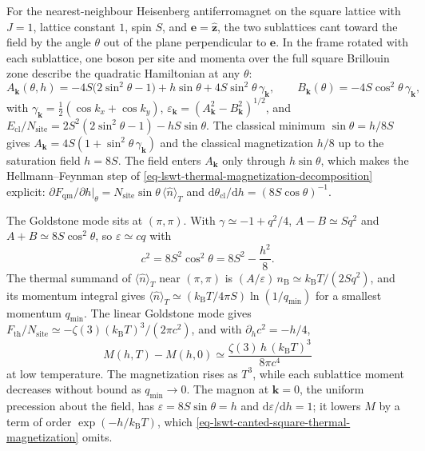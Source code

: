 For the nearest-neighbour Heisenberg antiferromagnet on the square lattice with \(J=1\), lattice constant \(1\), spin \(S\), and \(\mathbf e=\hat{\mathbf z}\), the two sublattices cant toward the field by the angle \(\theta\) out of the plane perpendicular to \(\mathbf e\). In the frame rotated with each sublattice, one boson per site and momenta over the full square Brillouin zone describe the quadratic Hamiltonian at any \(\theta\):
\[
A_{\mathbf k}(\theta,h)=-4S\big(2\sin^2\theta-1\big)+h\sin\theta+4S\sin^2\theta\,\gamma_{\mathbf k},
\qquad
B_{\mathbf k}(\theta)=-4S\cos^2\theta\,\gamma_{\mathbf k},
\]
with \(\gamma_{\mathbf k}=\tfrac12(\cos k_x+\cos k_y)\), \(\varepsilon_{\mathbf k}=(A_{\mathbf k}^2-B_{\mathbf k}^2)^{1/2}\), and \(E_{\mathrm{cl}}/N_{\mathrm{site}}=2S^2(2\sin^2\theta-1)-hS\sin\theta\). The classical minimum \(\sin\theta=h/8S\) gives \(A_{\mathbf k}=4S(1+\sin^2\theta\,\gamma_{\mathbf k})\) and the classical magnetization \(h/8\) up to the saturation field \(h=8S\). The field enters \(A_{\mathbf k}\) only through \(h\sin\theta\), which makes the Hellmann--Feynman step of \eqref{eq-lswt-thermal-magnetization-decomposition} explicit: \(\partial F_{\mathrm{qm}}/\partial h|_\theta=N_{\mathrm{site}}\sin\theta\,\langle\hat n\rangle_T\) and \(\mathrm d\theta_{\mathrm{cl}}/\mathrm dh=(8S\cos\theta)^{-1}\).

The Goldstone mode sits at \((\pi,\pi)\). With \(\gamma\simeq-1+q^2/4\), \(A-B\simeq Sq^2\) and \(A+B\simeq8S\cos^2\theta\), so \(\varepsilon\simeq cq\) with
\[
c^2=8S^2\cos^2\theta=8S^2-\frac{h^2}{8}.
\]
The thermal summand of \(\langle\hat n\rangle_T\) near \((\pi,\pi)\) is \((A/\varepsilon)\,n_{\mathrm B}\simeq k_{\mathrm B}T/(2Sq^2)\), and its momentum integral gives \(\langle\hat n\rangle_T\simeq(k_{\mathrm B}T/4\pi S)\ln(1/q_{\min})\) for a smallest momentum \(q_{\min}\). The linear Goldstone mode gives \(F_{\mathrm{th}}/N_{\mathrm{site}}\simeq-\zeta(3)(k_{\mathrm B}T)^3/(2\pi c^2)\), and with \(\partial_hc^2=-h/4\),
\begin{equation}\label{eq-lswt-canted-square-thermal-magnetization}
M(h,T)-M(h,0)\simeq\frac{\zeta(3)\,h\,(k_{\mathrm B}T)^3}{8\pi c^4}
\end{equation}
at low temperature. The magnetization rises as \(T^3\), while each sublattice moment decreases without bound as \(q_{\min}\to0\). The magnon at \(\mathbf k=0\), the uniform precession about the field, has \(\varepsilon=8S\sin\theta=h\) and \(\mathrm d\varepsilon/\mathrm dh=1\); it lowers \(M\) by a term of order \(\exp(-h/k_{\mathrm B}T)\), which \eqref{eq-lswt-canted-square-thermal-magnetization} omits.


